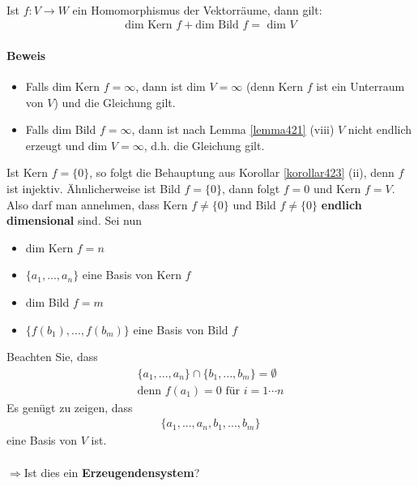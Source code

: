 \documentclass[11pt]{report}
\newcommand*\f[1] {\textbf{#1}}
\begin{document}
\begin{satz}
 \label{satz425} {\ \\}
 Ist $f: V \rightarrow W$ ein Homomorphismus der Vektorräume, dann gilt:
\begin{align}
 \text{dim Kern } f +  \text{dim Bild } f =  \text{ dim } V
\end{align}
\end{satz}
\paragraph{Beweis}
\begin{itemize}
 \item Falls dim Kern $f = \infty$, dann ist dim $V = \infty$ (denn Kern $f$ ist ein Unterraum von $V$) und die Gleichung gilt.
\item Falls dim Bild $f = \infty$, dann ist nach Lemma \ref{lemma421} (viii) $V$ nicht endlich erzeugt und dim $V = \infty$, d.h. die Gleichung gilt.
\end{itemize} \vspace*{0.3cm}
Ist Kern $f = \{0\}$, so folgt die Behauptung aus Korollar \ref{korollar423} (ii), denn $f$ ist injektiv. Ähnlicherweise ist Bild $f = \{0\}$, dann folgt $f=0$ und Kern $f = V$.\\
Also darf man annehmen, dass Kern $f \neq \{0\}$ und Bild $f \neq \{0\}$ \f{endlich dimensional} sind.\newpage
Sei nun
\begin{itemize}
 \item dim Kern $f = n$
 \item $\{a_1, ..., a_n\}$ eine Basis von Kern $f$
 \item dim Bild $f = m$
 \item $\{f(b_1), ..., f(b_m)\}$ eine Basis von Bild $f$
\end{itemize}
\vspace*{0.4cm}
Beachten Sie, dass
\begin{align}
 \{a_1, ..., a_n\} \cap \{b_1, ..., b_m\} = \emptyset \\
\text{denn } f(a_1) = 0 \text{ für } i = 1\cdots n
\end{align}
Es genügt zu zeigen, dass
\begin{align}
 \{a_1, ..., a_n, b_1, ..., b_m\}
\end{align}
eine Basis von $V$ ist. \\\\
$\Rightarrow $Ist dies ein \f{Erzeugendensystem}?\\\\
\end{document}
